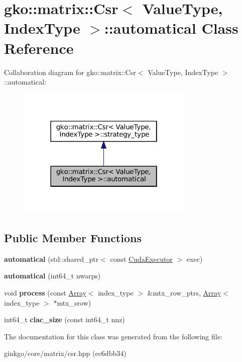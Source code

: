 \hypertarget{classgko_1_1matrix_1_1Csr_1_1automatical}{}\section{gko\+:\+:matrix\+:\+:Csr$<$ Value\+Type, Index\+Type $>$\+:\+:automatical Class Reference}
\label{classgko_1_1matrix_1_1Csr_1_1automatical}


Collaboration diagram for gko\+:\+:matrix\+:\+:Csr$<$ Value\+Type, Index\+Type $>$\+:\+:automatical\+:
\nopagebreak
\begin{figure}[H]
\begin{center}
\leavevmode
\includegraphics[width=238pt]{classgko_1_1matrix_1_1Csr_1_1automatical__coll__graph}
\end{center}
\end{figure}
\subsection*{Public Member Functions}
\begin{DoxyCompactItemize}
\item 
\mbox{\label{classgko_1_1matrix_1_1Csr_1_1automatical_a5e3cff9dc55b22b01ddf3db31731b267}} 
{\bfseries automatical} (std\+::shared\+\_\+ptr$<$ const \hyperlink{classgko_1_1CudaExecutor}{Cuda\+Executor} $>$ exec)
\item 
\mbox{\label{classgko_1_1matrix_1_1Csr_1_1automatical_af69e7b41ae7edd4d89c9a41763eb8ed9}} 
{\bfseries automatical} (int64\+\_\+t nwarps)
\item 
\mbox{\label{classgko_1_1matrix_1_1Csr_1_1automatical_adfc6b9f6bc311a1dedb758009a541741}} 
void {\bfseries process} (const \hyperlink{classgko_1_1Array}{Array}$<$ index\+\_\+type $>$ \&mtx\+\_\+row\+\_\+ptrs, \hyperlink{classgko_1_1Array}{Array}$<$ index\+\_\+type $>$ $\ast$mtx\+\_\+srow)
\item 
\mbox{\label{classgko_1_1matrix_1_1Csr_1_1automatical_af4ea78545a4fbdacfb75951fe3d0a701}} 
int64\+\_\+t {\bfseries clac\+\_\+size} (const int64\+\_\+t nnz)
\end{DoxyCompactItemize}


The documentation for this class was generated from the following file\+:\begin{DoxyCompactItemize}
\item 
ginkgo/core/matrix/csr.\+hpp (ec6dbb34)\end{DoxyCompactItemize}
